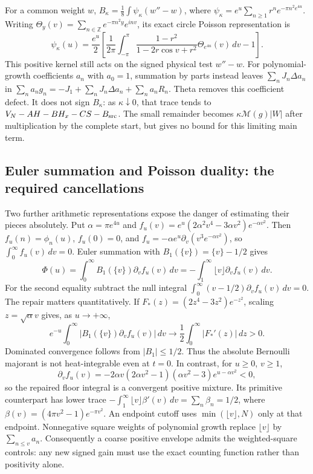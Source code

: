 \documentclass[11pt]{article}
\numberwithin{equation}{section}
\theoremstyle{definition}
\theoremstyle{remark}
\begin{document}
For a common weight $w$, $B_\kappa=\frac18\int\psi_\kappa(w''-w)$,
where $\psi_\kappa=e^u\sum_{n\ge1}r^ne^{-\pi n^2e^{4u}}$.
Writing $\Theta_y(v)=\sum_{n\in\mathbb Z}e^{-\pi n^2y}e^{inv}$,
its exact circle Poisson representation is
\begin{equation}
 \psi_\kappa(u)=\frac{e^u}{2}
 \left[\frac1{2\pi}\int_{-\pi}^{\pi}
 \frac{1-r^2}{1-2r\cos v+r^2}\Theta_{e^{4u}}(v)\,dv-1\right].
 \label{nonlocal:poisson-kernel}
\end{equation}
This positive kernel still acts on the signed physical test $w''-w$.
For polynomial-growth coefficients $a_n$ with $a_0=1$, summation by parts
instead leaves $\sum_nJ_n\Delta a_n$ in
$\sum_na_ng_n=-J_1+\sum_nJ_n\Delta a_n+\sum_na_nR_n$.
Theta removes this coefficient defect. It does not sign $B_\kappa$:
as $\kappa\downarrow0$, that trace tends to
$V_N-AH-BH_x-CS-B_{\rm src}$. The small remainder becomes
$\kappa\mathcal M(g)|W|$ after multiplication by the complete start,
but gives no bound for this limiting main term.

\subsection{Euler summation and Poisson duality: the required cancellations}
\label{nonlocal:continuous-index}

Two further arithmetic representations expose the danger of estimating
their pieces absolutely. Put $\alpha=\pi e^{4u}$ and
$f_u(v)=e^u(2\alpha^2v^4-3\alpha v^2)e^{-\alpha v^2}$.
Then $f_u(n)=\phi_n(u)$, $f_u(0)=0$, and
$f_u=-\alpha e^u\partial_v(v^3e^{-\alpha v^2})$, so
$\int_0^\infty f_u(v)\,dv=0$.
Euler summation with $B_1(\{v\})=\{v\}-1/2$ gives
\begin{equation}
 \Phi(u)=\int_0^\infty B_1(\{v\})\partial_vf_u(v)\,dv
        =-\int_1^\infty\lfloor v\rfloor\partial_vf_u(v)\,dv.
 \label{nonlocal:floor-repair}
\end{equation}
For the second equality subtract the null integral
$\int_0^\infty(v-1/2)\partial_vf_u(v)\,dv=0$.
The repair matters quantitatively. If
$F_*(z)=(2z^4-3z^2)e^{-z^2}$, scaling $z=\sqrt\alpha v$ gives, as $u\to+\infty$,
\begin{equation}
 e^{-u}\int_0^\infty|B_1(\{v\})\partial_vf_u(v)|\,dv
 \longrightarrow\frac12\int_0^\infty|F_*'(z)|\,dz>0.
 \label{nonlocal:bernoulli-loss}
\end{equation}
Dominated convergence follows from $|B_1|\le1/2$.
Thus the absolute Bernoulli majorant is not heat-integrable even at
$t=0$. In contrast, for $u\ge0$, $v\ge1$,
\[
 \partial_vf_u(v)
 =-2\alpha v(2\alpha v^2-1)(\alpha v^2-3)e^{u-\alpha v^2}<0,
\]
so the repaired floor integral is a convergent positive mixture.
Its primitive counterpart has lower trace
$-\int_1^\infty\lfloor v\rfloor\beta'(v)\,dv
=\sum_n\beta_n=1/2$, where
$\beta(v)=(4\pi v^2-1)e^{-\pi v^2}$.
An endpoint cutoff uses $\min(\lfloor v\rfloor,N)$ only at that endpoint.
Nonnegative square weights of polynomial growth replace $\lfloor v\rfloor$ by
$\sum_{n\le v}a_n$. Consequently a coarse positive envelope admits the
weighted-square controls: any new signed gain must use the exact counting
function rather than positivity alone.
\end{document}

